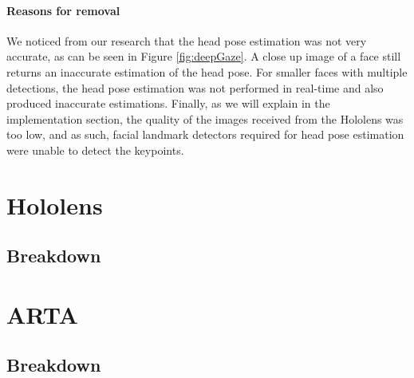 \paragraph{Reasons for removal} We noticed from our research that the head pose estimation was not very accurate, as can be seen in Figure \ref{fig:deepGaze}. A close up image of a face still returns an inaccurate estimation of the head pose. For smaller faces with multiple detections, the head pose estimation was not performed in real-time and also produced inaccurate estimations. Finally, as we will explain in the implementation section, the quality of the images received from the Hololens was too low, and as such, facial landmark detectors required for head pose estimation were unable to detect the keypoints.

\section{Hololens}
\subsection{Breakdown}

\section{ARTA}
\subsection{Breakdown}


